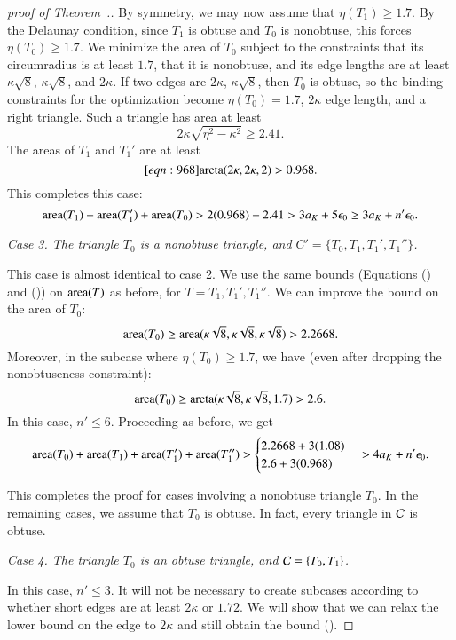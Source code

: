 \begin{proof}[proof of Theorem~.]
By symmetry, we may now assume that $\eta(T_1) \ge 1.7$.  By the
Delaunay condition, since $T_1$ is obtuse and $T_0$ is nonobtuse, this
forces $\eta(T_0)\ge 1.7$.  We minimize the area of $T_0$ subject to
the constraints that its circumradius is at least $1.7$, that it is
nonobtuse, and its edge lengths are at least $\kappa\sqrt{8}$,
$\kappa\sqrt{8}$, and $2\kappa$.  If two edges are $2\kappa$,
$\kappa\sqrt{8}$, then $T_0$ is obtuse, so the binding constraints for
the optimization become $\eta(T_0)=1.7$, $2\kappa$ edge length, and a
right triangle.  Such a triangle has area at least 
\[
2\kappa\sqrt{\eta^2 - \kappa^2} \ge 2.41.
\]  
The areas of $T_1$ and $T_1'$ are at least
\begin{equation}\libel{eqn:968}
\areta(2\kappa,2\kappa,2) > 0.968.
\end{equation}
This completes this case:
\[
{\operatorname{area}}(T_1) + {\operatorname{area}}(T_1') + {\operatorname{area}}(T_0) 
>
2(0.968) + 2.41 > 3a_K + 5 \epsilon_0 \ge 3a_K + n'\epsilon_0.
\] %

{\it Case 3. The triangle $T_0$ is a nonobtuse triangle, and $C'=\{T_0,T_1,T_1',T_1''\}$.}

This case is almost identical to case 2.  We use the same bounds
(Equations () and ()) on ${\operatorname{area}}(T)$ as
before, for $T = T_1, T_1', T_1''$.  We can improve the bound on the
area of $T_0$:
\[
{\operatorname{area}}(T_0) \ge {\operatorname{area}}(\kappa\sqrt{8},\kappa\sqrt{8},\kappa\sqrt{8}) > 2.2668.
\]
Moreover, in the subcase where $\eta(T_0)\ge 1.7$, we have
(even after dropping the nonobtuseness constraint):
\[
{\operatorname{area}}(T_0) \ge {\operatorname{areta}}(\kappa\sqrt{8},\kappa\sqrt{8},1.7) > 2.6.
\]
In this case, $n'\le 6$.  Proceeding as before, we get
\[
{\operatorname{area}}(T_0)  + {\operatorname{area}}(T_1) + {\operatorname{area}}(T_1') + {\operatorname{area}}(T_1'') > 
\begin{cases}
2.2668 + 3 (1.08) \\
2.6 + 3(0.968)
\end{cases}
> 4a_K + n' \epsilon_0.
\] %


This completes the proof for cases involving a nonobtuse triangle
$T_0$.  In the remaining cases, we assume that $T_0$ is obtuse.  In
fact, every triangle in $\mathcal C$ is obtuse.

{\it Case 4. The triangle $T_0$ is an obtuse triangle, and $\mathcal C=\{T_0,T_1\}$.}  

In this case, $n'\le 3$.  It will not be necessary to create subcases
according to whether short edges are at least $2\kappa$ or $1.72$.  We
will show that we can relax the lower bound on the edge to $2\kappa$
and still obtain the bound ().


\end{proof}
